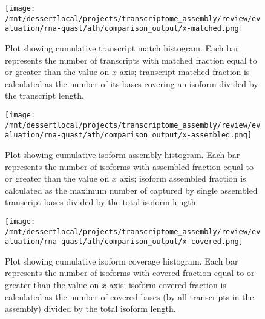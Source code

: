 \documentclass[12pt,a4paper]{article}
\begin{document}
\begin{figure}[t]
\centering
\texttt{[image: /mnt/dessertlocal/projects/transcriptome\_assembly/review/evaluation/rna-quast/ath/comparison\_output/x-matched.png]}
\caption{Plot showing cumulative transcript match histogram. Each bar represents the number of transcripts with matched fraction equal to or greater than the value on $x$ axis; transcript matched fraction is calculated as the number of its bases covering an isoform divided by the transcript length.}
\end{figure}
\FloatBarrier
\clearpage


\begin{figure}[t]
\centering
\texttt{[image: /mnt/dessertlocal/projects/transcriptome\_assembly/review/evaluation/rna-quast/ath/comparison\_output/x-assembled.png]}
\caption{Plot showing cumulative isoform assembly histogram. Each bar represents the number of isoforms with assembled fraction equal to or greater than the value on $x$ axis; isoform assembled fraction is calculated as the maximum number of captured by single assembled transcript bases divided by the total isoform length.}
\end{figure}
\FloatBarrier
\clearpage


\begin{figure}[t]
\centering
\texttt{[image: /mnt/dessertlocal/projects/transcriptome\_assembly/review/evaluation/rna-quast/ath/comparison\_output/x-covered.png]}
\caption{Plot showing cumulative isoform coverage histogram. Each bar represents the number of isoforms with covered fraction equal to or greater than the value on $x$ axis; isoform covered fraction is calculated as the number of covered bases (by all transcripts in the assembly) divided by the total isoform length.}
\end{figure}
\FloatBarrier
\clearpage
\end{document}
